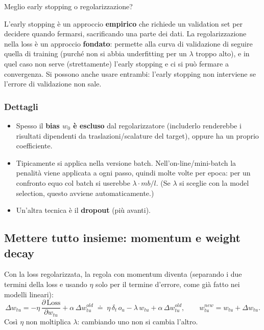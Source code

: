 \begin{boxquestion}{Meglio early stopping o regolarizzazione?}

L'early stopping è un approccio \textbf{empirico} che richiede un
validation set per decidere quando fermarsi, sacrificando una parte dei
dati. La regolarizzazione nella loss è un approccio \textbf{fondato}:
permette alla curva di validazione di seguire quella di training (purché
non si abbia underfitting per un \(\lambda\) troppo alto), e in quel
caso non serve (strettamente) l'early stopping e ci si può fermare a
convergenza. Si possono anche usare entrambi: l'early stopping non
interviene se l'errore di validazione non sale.

\end{boxquestion}

\subsubsection{Dettagli}\label{dettagli}

\begin{itemize}
\tightlist
\item
  Spesso il \textbf{bias \(w_0\) è escluso} dal regolarizzatore
  (includerlo renderebbe i risultati dipendenti da traslazioni/scalature
  del target), oppure ha un proprio coefficiente.
\item
  Tipicamente si applica nella versione batch. Nell'on-line/mini-batch
  la penalità viene applicata a ogni passo, quindi molte volte per
  epoca: per un confronto equo col batch si userebbe
  \(\lambda\cdot mb/l\). (Se \(\lambda\) si sceglie con la model
  selection, questo avviene automaticamente.)
\item
  Un'altra tecnica è il \textbf{dropout} (più avanti).
\end{itemize}

\subsection{Mettere tutto insieme: momentum e weight
decay}\label{mettere-tutto-insieme-momentum-e-weight-decay}

Con la loss regolarizzata, la regola con momentum diventa (separando i
due termini della loss e usando \(\eta\) solo per il termine d'errore,
come già fatto nei modelli lineari): \[
\Delta w_{tu} = -\eta\,\frac{\partial\,\text{Loss}}{\partial w_{tu}} + \alpha\,\Delta w_{tu}^{old} \;\doteq\; \eta\,\delta_t\,o_u - \lambda\,w_{tu} + \alpha\,\Delta w_{tu}^{old}, \qquad w_{tu}^{new} = w_{tu} + \Delta w_{tu}.
\] Così \(\eta\) non moltiplica \(\lambda\): cambiando uno non si cambia
l'altro.

